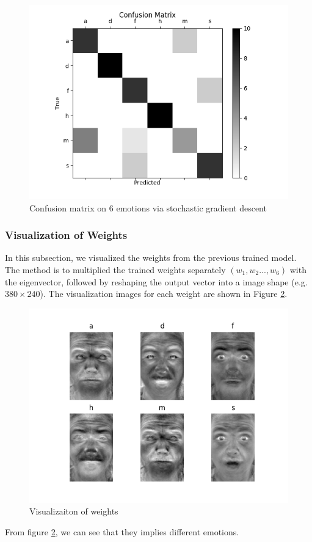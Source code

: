 \documentclass{article}
\begin{document}
\begin{figure}[ht]
\begin{center}
\includegraphics[scale=0.5]{images/confusion_sgd.png}
\end{center}
\caption{Confusion matrix on 6 emotions via stochastic gradient descent}
\label{figure: confusion_sgd}
\end{figure}
\subsubsection{Visualization of Weights}
In this subsection, we visualized the weights from the previous trained model. The method is to multiplied the trained weights separately $(w_1,w_2...,w_6)$ with the eigenvector, followed by reshaping the output vector into a image shape (e.g. $380\times 240$). The visualization images for each weight are shown in Figure \ref{figure: visualizaiton}.
\begin{figure}[ht]
\begin{center}
\includegraphics[scale=0.5]{images/visualization.png}
\end{center}
\caption{Visualizaiton of weights}
\label{figure: visualizaiton}
\end{figure}
From figure \ref{figure: visualizaiton}, we can see that they implies different emotions.
\end{document}
